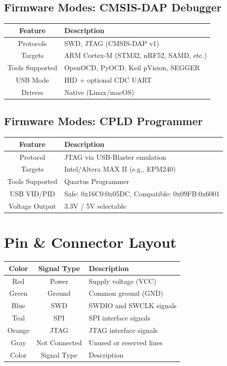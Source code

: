\documentclass[10pt]{article}
\begin{document}
\subsection*{Firmware Modes: CMSIS-DAP Debugger}
\begin{tabularx}{\textwidth}{|c|>{\RaggedRight\arraybackslash}X|}
\hline
\rowcolor{headergray}
Feature & Description \\
\hline
Protocols & SWD, JTAG (CMSIS-DAP v1) \\
Targets & ARM Cortex-M (STM32, nRF52, SAMD, etc.) \\
Tools Supported & OpenOCD, PyOCD, Keil µVision, SEGGER \\
USB Mode & HID + optional CDC UART \\
Drivers & Native (Linux/macOS) \\
\hline
\end{tabularx}


\subsection*{Firmware Modes: CPLD Programmer}
\begin{tabularx}{\textwidth}{|c|>{\RaggedRight\arraybackslash}X|}
\hline
\rowcolor{headergray}
Feature & Description \\
\hline
Protocol & JTAG via USB-Blaster emulation \\
Targets & Intel/Altera MAX II (e.g., EPM240) \\
Tools Supported & Quartus Programmer \\
USB VID/PID & Safe: 0x16C0:0x05DC, Compatible: 0x09FB:0x6001 \\
Voltage Output & 3.3V / 5V selectable \\
\hline
\end{tabularx}






\section*{Pin \& Connector Layout}
\begin{tabularx}{\textwidth}{|c|c|>{\RaggedRight\arraybackslash}X|}
\hline
\rowcolor{headergray}
Color & Signal Type & Description \\
\hline
Red & Power & Supply voltage (VCC) \\
Green & Ground & Common ground (GND) \\
Blue & SWD & SWDIO and SWCLK signals \\
Teal & SPI & SPI interface signals \\
Orange & JTAG & JTAG interface signals \\
Gray & Not Connected & Unused or reserved lines \\
Color & Signal Type & Description \\
\hline
\end{tabularx}
\end{document}
